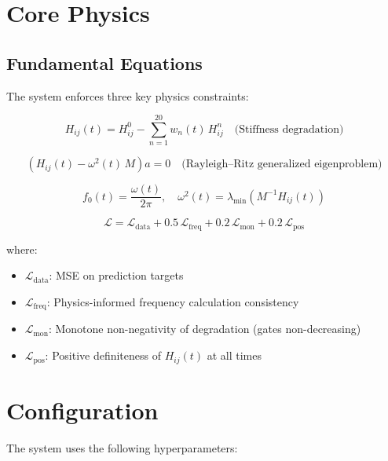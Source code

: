 \documentclass[11pt]{article}
\begin{document}
\section{Core Physics}

\subsection{Fundamental Equations}

The system enforces three key physics constraints:

\begin{equation}
H_{ij}(t) = H_{ij}^0 - \sum_{n=1}^{20} w_n(t)\,H_{ij}^n \quad \text{(Stiffness degradation)}
\end{equation}

\begin{equation}
\left( H_{ij}(t) - \omega^2(t)\,M \right)a = 0 \quad \text{(Rayleigh--Ritz generalized eigenproblem)}
\end{equation}

\begin{equation}
f_0(t) = \frac{\omega(t)}{2\pi}, \quad \omega^2(t)=\lambda_{\min}\!\left(M^{-1}H_{ij}(t)\right)
\end{equation}

\begin{equation}
\mathcal{L} = \mathcal{L}_{\text{data}} + 0.5\,\mathcal{L}_{\text{freq}} + 0.2\,\mathcal{L}_{\text{mon}} + 0.2\,\mathcal{L}_{\text{pos}}
\end{equation}

where:
\begin{itemize}
  \item $\mathcal{L}_{\text{data}}$: MSE on prediction targets
  \item $\mathcal{L}_{\text{freq}}$: Physics-informed frequency calculation consistency
  \item $\mathcal{L}_{\text{mon}}$: Monotone non-negativity of degradation (gates non-decreasing)
  \item $\mathcal{L}_{\text{pos}}$: Positive definiteness of $H_{ij}(t)$ at all times
\end{itemize}

\section{Configuration}

The system uses the following hyperparameters:
\end{document}
